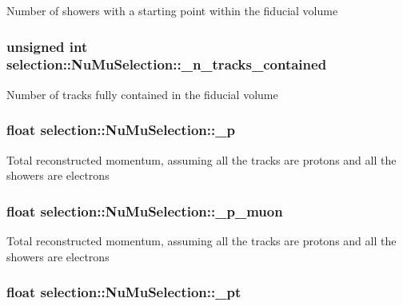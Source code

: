 Number of showers with a starting point within the fiducial volume \hypertarget{classselection_1_1NuMuSelection_a4f7501393a59de50a8547b6ff2f286b8}{
\subsubsection[{\-\_\-n\-\_\-tracks\-\_\-contained}]{\setlength{\rightskip}{0pt plus 5cm}unsigned int selection\-::\-Nu\-Mu\-Selection\-::\-\_\-n\-\_\-tracks\-\_\-contained\hspace{0.3cm}{\ttfamily [private]}}}\label{classselection_1_1NuMuSelection_a4f7501393a59de50a8547b6ff2f286b8}
Number of tracks fully contained in the fiducial volume \hypertarget{classselection_1_1NuMuSelection_a821979901c138eca118246a1eeedcd80}{
\subsubsection[{\-\_\-p}]{\setlength{\rightskip}{0pt plus 5cm}float selection\-::\-Nu\-Mu\-Selection\-::\-\_\-p\hspace{0.3cm}{\ttfamily [private]}}}\label{classselection_1_1NuMuSelection_a821979901c138eca118246a1eeedcd80}
Total reconstructed momentum, assuming all the tracks are protons and all the showers are electrons \hypertarget{classselection_1_1NuMuSelection_a94f9c7445dc565e03c899633f031250d}{
\subsubsection[{\-\_\-p\-\_\-muon}]{\setlength{\rightskip}{0pt plus 5cm}float selection\-::\-Nu\-Mu\-Selection\-::\-\_\-p\-\_\-muon\hspace{0.3cm}{\ttfamily [private]}}}\label{classselection_1_1NuMuSelection_a94f9c7445dc565e03c899633f031250d}
Total reconstructed momentum, assuming all the tracks are protons and all the showers are electrons \hypertarget{classselection_1_1NuMuSelection_aab5bb47332ae2489a5ab96078397d075}{
\subsubsection[{\-\_\-pt}]{\setlength{\rightskip}{0pt plus 5cm}float selection\-::\-Nu\-Mu\-Selection\-::\-\_\-pt\hspace{0.3cm}{\ttfamily [private]}}}\label{classselection_1_1NuMuSelection_aab5bb47332ae2489a5ab96078397d075}
